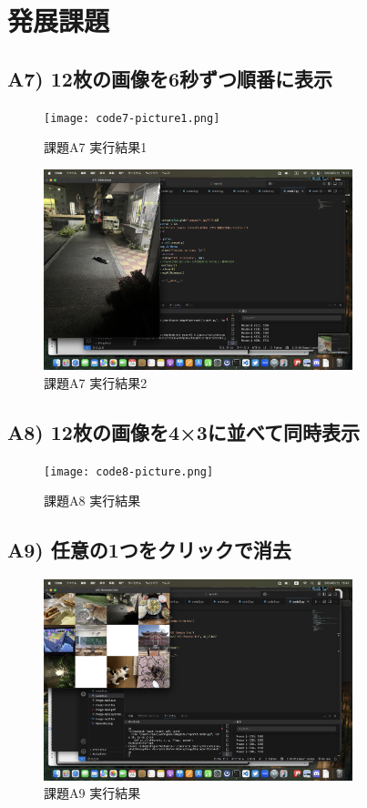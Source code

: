 \documentclass[a4paper,11pt,titlepage]{jsarticle}
\begin{document}
\section{発展課題}

\subsection{A7) 12枚の画像を6秒ずつ順番に表示}

\begin{figure}[H]
  \centering
  \texttt{[image: code7-picture1.png]}
  \caption{課題A7 実行結果1}
\end{figure}
\begin{figure}[H]
  \centering
  \includegraphics[width=0.8\textwidth]{code7-picture2.png}
  \caption{課題A7 実行結果2}
\end{figure}

\subsection{A8) 12枚の画像を4×3に並べて同時表示}

\begin{figure}[H]
  \centering
  \texttt{[image: code8-picture.png]}
  \caption{課題A8 実行結果}
\end{figure}

\subsection{A9) 任意の1つをクリックで消去}

\begin{figure}[H]
  \centering
  \includegraphics[width=0.8\textwidth]{code9-picture.png}
  \caption{課題A9 実行結果}
\end{figure}
\end{document}
